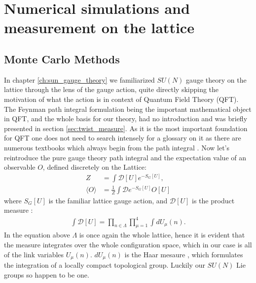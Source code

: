 \documentclass[english,twoside,openright]{UH_TCM_MSc}
\begin{document}
\chapter{Numerical simulations and measurement on the lattice}

\section{Monte Carlo Methods}

In chapter \ref{ch:sun_gauge_theory} we familiarized $SU(N)$ gauge theory on the lattice through the lens of the gauge action, quite directly skipping the motivation of what the action is in context of Quantum Field Theory (QFT). The Feynman path integral formulation being the important mathematical object in QFT, and the whole basis for our theory, had no introduction and was briefly presented in section \ref{sec:twist_measure}. As it is the most important foundation for QFT one does not need to search intensely for a glossary on it as there are numerous textbooks which always begin from the path integral \cite{Creutz:1983njd, gattringer2009quantum, Rothe:1992nt}. Now let's reintroduce the pure gauge theory path integral and the expectation value of an observable $O$, defined discretely on the Lattice:
\begin{align}
    Z &= \int \mathcal{D}[U] e^{-S_G[U]}, \label{eq:path_integral} \\
    \langle O \rangle &= \frac{1}{Z}\int \mathcal{D}e^{-S_G[U]}O[U]
\end{align}
where $S_G[U]$ is the familiar lattice gauge action, and $\mathcal{D}[U]$ is the product measure \cite[ch. 3]{gattringer2009quantum}:
\begin{align}
    \int \mathcal{D}[U] = \prod_{n\in \Lambda}\prod_{\mu=1}^4 \int dU_{\mu}(n).
\end{align}
In the equation above $\Lambda$ is once again the whole lattice, hence it is evident that the measure integrates over the whole configuration space, which in our case is all of the link variables $U_\mu(n)$. $dU_{\mu}(n)$ is the Haar mesaure \cite{Haar1933,Howes1995}, which formulates the integration of a locally compact topological group. Luckily our $SU(N)$ Lie groups so happen to be one. 
\end{document}
